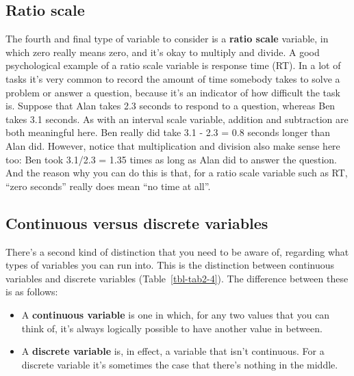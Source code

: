 \documentclass[
  a4paper,
]{book}
\providecommand{\tightlist}{%
  \setlength{\itemsep}{0pt}\setlength{\parskip}{0pt}}
\begin{document}
\subsection{Ratio scale}\label{ratio-scale}

The fourth and final type of variable to consider is a \textbf{ratio
scale} variable, in which zero really means zero, and it's okay to
multiply and divide. A good psychological example of a ratio scale
variable is response time (RT). In a lot of tasks it's very common to
record the amount of time somebody takes to solve a problem or answer a
question, because it's an indicator of how difficult the task is.
Suppose that Alan takes 2.3 seconds to respond to a question, whereas
Ben takes 3.1 seconds. As with an interval scale variable, addition and
subtraction are both meaningful here. Ben really did take 3.1 - 2.3 =
0.8 seconds longer than Alan did. However, notice that multiplication
and division also make sense here too: Ben took 3.1/2.3 = 1.35 times as
long as Alan did to answer the question. And the reason why you can do
this is that, for a ratio scale variable such as RT, ``zero seconds''
really does mean ``no time at all''.

\subsection{Continuous versus discrete
variables}\label{continuous-versus-discrete-variables}

There's a second kind of distinction that you need to be aware of,
regarding what types of variables you can run into. This is the
distinction between continuous variables and discrete variables
(Table~\ref{tbl-tab2-4}). The difference between these is as follows:

\begin{itemize}
\tightlist
\item
  A \textbf{continuous variable} is one in which, for any two values
  that you can think of, it's always logically possible to have another
  value in between.
\item
  A \textbf{discrete variable} is, in effect, a variable that isn't
  continuous. For a discrete variable it's sometimes the case that
  there's nothing in the middle.
\end{itemize}
\end{document}
